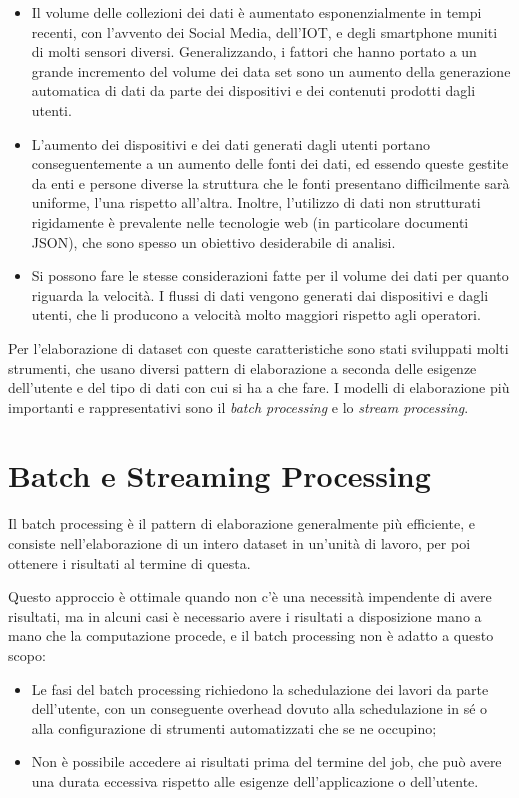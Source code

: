 \documentclass[italian,a4paper, twoside, 12pt]{report}
\begin{document}
\begin{itemize}
\item
  Il volume delle collezioni dei dati è aumentato esponenzialmente in
  tempi recenti, con l'avvento dei Social Media, dell'IOT, e degli
  smartphone muniti di molti sensori diversi. Generalizzando, i fattori
  che hanno portato a un grande incremento del volume dei data set sono
  un aumento della generazione automatica di dati da parte dei
  dispositivi e dei contenuti prodotti dagli utenti.
\item
  L'aumento dei dispositivi e dei dati generati dagli utenti portano
  conseguentemente a un aumento delle fonti dei dati, ed essendo queste
  gestite da enti e persone diverse la struttura che le fonti presentano
  difficilmente sarà uniforme, l'una rispetto all'altra. Inoltre,
  l'utilizzo di dati non strutturati rigidamente è prevalente nelle
  tecnologie web (in particolare documenti JSON), che sono spesso un
  obiettivo desiderabile di analisi.
\item
  Si possono fare le stesse considerazioni fatte per il volume dei dati
  per quanto riguarda la velocità. I flussi di dati vengono generati dai
  dispositivi e dagli utenti, che li producono a velocità molto maggiori
  rispetto agli operatori.
\end{itemize}

Per l'elaborazione di dataset con queste caratteristiche sono stati
sviluppati molti strumenti, che usano diversi pattern di elaborazione a
seconda delle esigenze dell'utente e del tipo di dati con cui si ha a
che fare. I modelli di elaborazione più importanti e rappresentativi
sono il \emph{batch processing} e lo \emph{stream processing}.

\section{Batch e Streaming
Processing}\label{batch-e-streaming-processing}

Il batch processing è il pattern di elaborazione generalmente più
efficiente, e consiste nell'elaborazione di un intero dataset in
un'unità di lavoro, per poi ottenere i risultati al termine di questa.

Questo approccio è ottimale quando non c'è una necessità impendente di
avere risultati, ma in alcuni casi è necessario avere i risultati a
disposizione mano a mano che la computazione procede, e il batch
processing non è adatto a questo scopo:

\begin{itemize}
\item
  Le fasi del batch processing richiedono la schedulazione dei lavori da
  parte dell'utente, con un conseguente overhead dovuto alla
  schedulazione in sé o alla configurazione di strumenti automatizzati
  che se ne occupino;
\item
  Non è possibile accedere ai risultati prima del termine del job, che
  può avere una durata eccessiva rispetto alle esigenze
  dell'applicazione o dell'utente.
\end{itemize}
\end{document}
